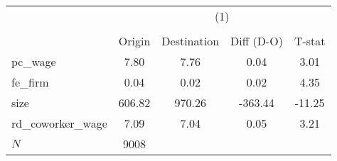 {
\def\sym#1{\ifmmode^{#1}\else\(^{#1}\)\fi}
\begin{tabular}{l*{1}{cccc}}
\hline\hline
            &\multicolumn{4}{c}{(1)}                            \\
            &\multicolumn{4}{c}{}                               \\
            &      Origin& Destination&  Diff (D-O)&      T-stat\\
\hline
pc\_wage     &        7.80&        7.76&        0.04&        3.01\\
fe\_firm     &        0.04&        0.02&        0.02&        4.35\\
size        &      606.82&      970.26&     -363.44&      -11.25\\
rd\_coworker\_wage&        7.09&        7.04&        0.05&        3.21\\
\hline
\(N\)       &        9008&            &            &            \\
\hline\hline
\end{tabular}
}
